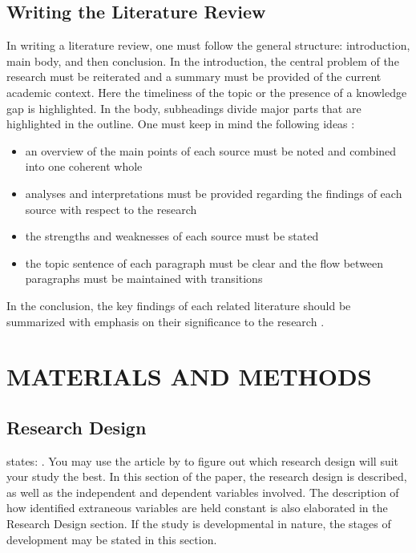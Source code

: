 \documentclass{strrespaper-trad}
\begin{document}
		\section*{Writing the Literature Review}
			In writing a literature review, one must follow the general structure: introduction, main body, and then conclusion.
			In the introduction, the central problem of the research must be reiterated and a summary must be provided of the current academic context.
			Here the timeliness of the topic or the presence of a knowledge gap is highlighted.
			In the body, subheadings divide major parts that are highlighted in the outline.
			One must keep in mind the following ideas \autocite{mccombesLiteratureReviewComplete2019}:
			\begin{itemize}
				\item an overview of the main points of each source must be noted and combined into one coherent whole
				\item analyses and interpretations must be provided regarding the findings of each source with respect to the research
				\item the strengths and weaknesses of each source must be stated
				\item the topic sentence of each paragraph must be clear and the flow between paragraphs must be maintained with transitions
			\end{itemize}
			In the conclusion, the key findings of each related literature should be summarized with emphasis on their significance to the research \autocite{mccombesLiteratureReviewComplete2019}.

	\chapter{MATERIALS AND METHODS} \label{chp:materials_and_methods}
		\section{Research Design}
			\textcite{labareeTypesResearchDesigns2020} states: .
			You may use the article by \textcite{labareeTypesResearchDesigns2020} to figure out which research design will suit your study the best.
			In this section of the paper, the research design is described, as well as the independent and dependent variables involved.
			The description of how identified extraneous variables are held constant is also elaborated in the Research Design section.
			If the study is developmental in nature, the stages of development may be stated in this section.
\end{document}

